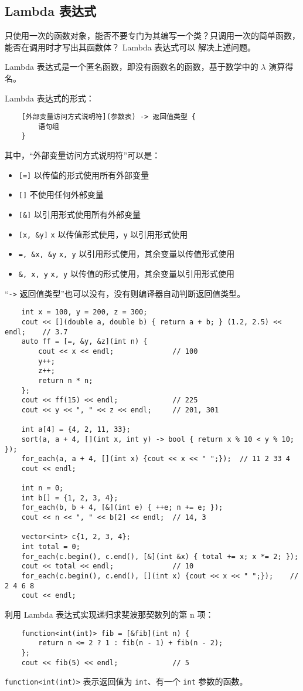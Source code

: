 \documentclass[UTF8]{ctexart}
\begin{document}
\subsection{Lambda 表达式}
只使用一次的函数对象，能否不要专门为其编写一个类？只调用一次的简单函数，能否在调用时才写出其函数体？ Lambda 表达式可以
解决上述问题。

Lambda 表达式是一个匿名函数，即没有函数名的函数，基于数学中的 $\lambda$ 演算得名。

Lambda 表达式的形式：
\begin{verbatim}
    [外部变量访问方式说明符](参数表) -> 返回值类型 {
        语句组
    }
\end{verbatim}
其中，“外部变量访问方式说明符”可以是：
\begin{itemize}
    \item \texttt{[=]} 以传值的形式使用所有外部变量
    \item \texttt{[]} 不使用任何外部变量
    \item \texttt{[\&]} 以引用形式使用所有外部变量
    \item \texttt{[x, \&y]} \texttt{x} 以传值形式使用，\texttt{y} 以引用形式使用
    \item \texttt{=, \&x, \&y} \texttt{x, y} 以引用形式使用，其余变量以传值形式使用
    \item \texttt{\&, x, y} \texttt{x, y} 以传值的形式使用，其余变量以引用形式使用
\end{itemize}
“\texttt{->} 返回值类型”也可以没有，没有则编译器自动判断返回值类型。

\begin{verbatim}
    int x = 100, y = 200, z = 300;
    cout << [](double a, double b) { return a + b; } (1.2, 2.5) << endl;    // 3.7
    auto ff = [=, &y, &z](int n) {
        cout << x << endl;              // 100
        y++;
        z++;
        return n * n;
    };
    cout << ff(15) << endl;             // 225
    cout << y << ", " << z << endl;     // 201, 301

    int a[4] = {4, 2, 11, 33};
    sort(a, a + 4, [](int x, int y) -> bool { return x % 10 < y % 10; });
    for_each(a, a + 4, [](int x) {cout << x << " ";});  // 11 2 33 4
    cout << endl;

    int n = 0;
    int b[] = {1, 2, 3, 4};
    for_each(b, b + 4, [&](int e) { ++e; n += e; });
    cout << n << ", " << b[2] << endl;  // 14, 3

    vector<int> c{1, 2, 3, 4};
    int total = 0;
    for_each(c.begin(), c.end(), [&](int &x) { total += x; x *= 2; });
    cout << total << endl;              // 10
    for_each(c.begin(), c.end(), [](int x) {cout << x << " ";});    // 2 4 6 8
    cout << endl;
\end{verbatim}

利用 Lambda 表达式实现递归求斐波那契数列的第 n 项：
\begin{verbatim}
    function<int(int)> fib = [&fib](int n) {
        return n <= 2 ? 1 : fib(n - 1) + fib(n - 2);
    };
    cout << fib(5) << endl;             // 5
\end{verbatim}
\texttt{function<int(int)>} 表示返回值为 \texttt{int}、有一个 \texttt{int} 参数的函数。
\end{document}
